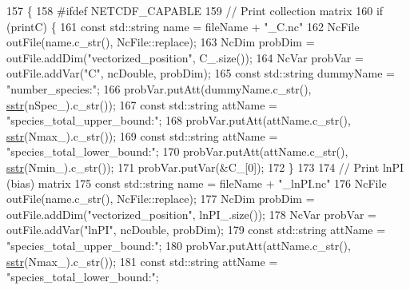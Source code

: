 \begin{DoxyCode}
157                                                        \{
158 \textcolor{preprocessor}{#ifdef NETCDF\_CAPABLE}
159                 \textcolor{comment}{// Print collection matrix}
160                 \textcolor{keywordflow}{if} (printC) \{
161                                 \textcolor{keyword}{const} std::string name = fileName + \textcolor{stringliteral}{"\_C.nc"}
162                                 NcFile outFile(name.c\_str(), NcFile::replace);
163                                 NcDim probDim = outFile.addDim(\textcolor{stringliteral}{"vectorized\_position"}, C\_.size());
164                                 NcVar probVar = outFile.addVar(\textcolor{stringliteral}{"C"}, ncDouble, probDim);
165                                 \textcolor{keyword}{const} std::string dummyName = \textcolor{stringliteral}{"number\_species:"};
166                                 probVar.putAtt(dummyName.c\_str(), \hyperlink{utilities_8h_a8feb627efa8e8113cdf95f9a6151a088}{sstr}(nSpec\_).c\_str());
167                                 \textcolor{keyword}{const} std::string attName = \textcolor{stringliteral}{"species\_total\_upper\_bound:"};
168                                 probVar.putAtt(attName.c\_str(), \hyperlink{utilities_8h_a8feb627efa8e8113cdf95f9a6151a088}{sstr}(Nmax\_).c\_str());
169                                 \textcolor{keyword}{const} std::string attName = \textcolor{stringliteral}{"species\_total\_lower\_bound:"};
170                                 probVar.putAtt(attName.c\_str(), \hyperlink{utilities_8h_a8feb627efa8e8113cdf95f9a6151a088}{sstr}(Nmin\_).c\_str());
171                                 probVar.putVar(&C\_[0]);
172                 \}
173                 
174                 \textcolor{comment}{// Print lnPI (bias) matrix}
175                 \textcolor{keyword}{const} std::string name = fileName + \textcolor{stringliteral}{"\_lnPI.nc"}
176                 NcFile outFile(name.c\_str(), NcFile::replace);
177                 NcDim probDim = outFile.addDim(\textcolor{stringliteral}{"vectorized\_position"}, lnPI\_.size());
178                 NcVar probVar = outFile.addVar(\textcolor{stringliteral}{"lnPI"}, ncDouble, probDim);
179                 \textcolor{keyword}{const} std::string attName = \textcolor{stringliteral}{"species\_total\_upper\_bound:"};
180                 probVar.putAtt(attName.c\_str(), \hyperlink{utilities_8h_a8feb627efa8e8113cdf95f9a6151a088}{sstr}(Nmax\_).c\_str());
181                 \textcolor{keyword}{const} std::string attName = \textcolor{stringliteral}{"species\_total\_lower\_bound:"};

\end{DoxyCode}

